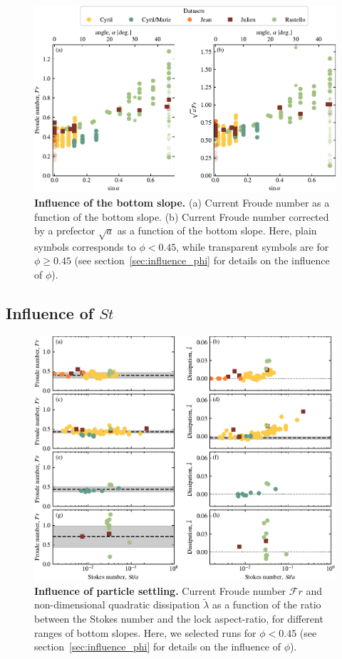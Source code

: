 \documentclass[twocolumn]{article}
\begin{document}
\begin{figure}
	\centering
	\includegraphics{figure4.pdf}
	\caption{\textbf{Influence of the bottom slope.} (a) Current Froude number as a function of the bottom slope. (b) Current Froude number corrected by a prefector $\sqrt{a}$ as a function of the bottom slope. Here, plain symbols corresponds to $\phi < 0.45$, while transparent symbols are for $\phi \geq 0.45$ (see section~\ref{sec:influence_phi} for details on the influence of $\phi$).}
	\label{fig:fig4}
\end{figure}

\subsection{Influence of $St$}

\begin{figure}
	\centering
	\includegraphics{figure5.pdf}
	\caption{\textbf{Influence of particle settling.} Current Froude number $\mathcal{F}r$ and non-dimensional quadratic dissipation $\tilde{\lambda}$ as a function of the ratio between the Stokes number and the lock aspect-ratio, for different ranges of bottom slopes. Here, we selected runs for $\phi < 0.45$ (see section~\ref{sec:influence_phi} for details on the influence of $\phi$).}
	\label{fig:fig5}
\end{figure}
\end{document}
